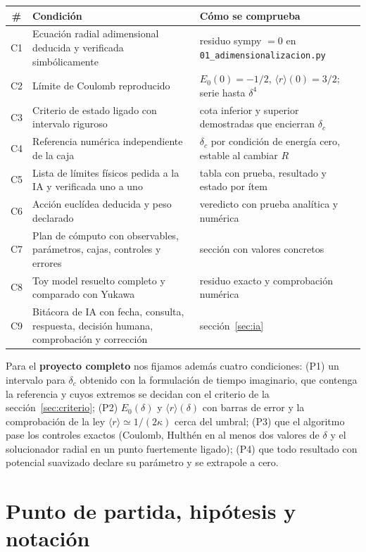 \documentclass[11pt]{article}
\newcommand{\dc}{\delta_c}
\begin{document}
\begin{table}[H]
\centering
\small
\begin{tabular}{@{}cL{6.4cm}L{6.6cm}@{}}
\toprule
\# & \textbf{Condición} & \textbf{Cómo se comprueba}\\
\midrule
C1 & Ecuación radial adimensional deducida y verificada simbólicamente & residuo sympy $=0$ en \texttt{01\_adimensionalizacion.py}\\
C2 & Límite de Coulomb reproducido & $E_0(0)=-1/2$, $\langle r\rangle(0)=3/2$; serie hasta $\delta^4$\\
C3 & Criterio de estado ligado con intervalo riguroso & cota inferior y superior demostradas que encierran $\dc$\\
C4 & Referencia numérica independiente de la caja & $\dc$ por condición de energía cero, estable al cambiar $R$\\
C5 & Lista de límites físicos pedida a la IA y verificada uno a uno & tabla con prueba, resultado y estado por ítem\\
C6 & Acción euclídea deducida y peso declarado & veredicto con prueba analítica y numérica\\
C7 & Plan de cómputo con observables, parámetros, cajas, controles y errores & sección con valores concretos\\
C8 & Toy model resuelto completo y comparado con Yukawa & residuo exacto y comprobación numérica\\
C9 & Bitácora de IA con fecha, consulta, respuesta, decisión humana, comprobación y corrección & sección~\ref{sec:ia}\\
\bottomrule
\end{tabular}
\end{table}

Para el \textbf{proyecto completo} nos fijamos además cuatro condiciones: (P1) un intervalo para $\dc$ obtenido con la formulación de tiempo imaginario, que contenga la referencia y cuyos extremos se decidan con el criterio de la sección~\ref{sec:criterio}; (P2) $E_0(\delta)$ y $\langle r\rangle(\delta)$ con barras de error y la comprobación de la ley $\langle r\rangle\simeq1/(2\kappa)$ cerca del umbral; (P3) que el algoritmo pase los controles exactos (Coulomb, Hulthén en al menos dos valores de $\delta$ y el solucionador radial en un punto fuertemente ligado); (P4) que todo resultado con potencial suavizado declare su parámetro y se extrapole a cero.

\section{Punto de partida, hipótesis y notación}
\label{sec:hipotesis}
\end{document}
